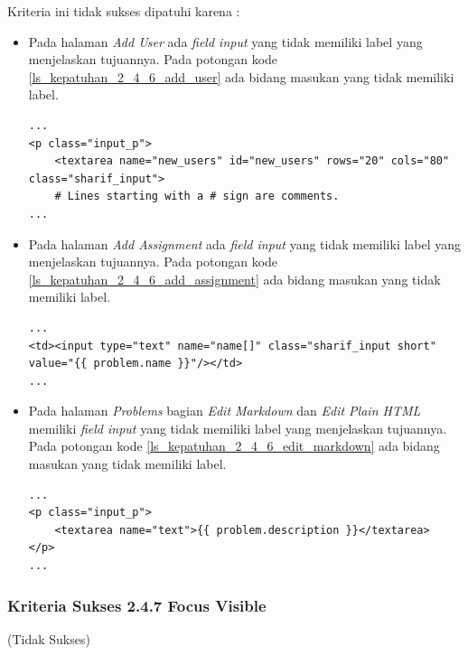 \documentclass[a4paper,twoside]{article}
\begin{document}
\begin{enumerate}
		Kriteria ini tidak sukses dipatuhi karena :
		\begin{itemize}
			\item Pada halaman \textit{Add User} ada \textit{field input} yang tidak memiliki label yang menjelaskan tujuannya. Pada potongan kode \ref{ls_kepatuhan_2_4_6_add_user} ada bidang masukan yang tidak memiliki label.
			\begin{lstlisting}[basicstyle=\ttfamily, frame=single,
			columns=fullflexible, keepspaces=true, breaklines=true, label=ls_kepatuhan_2_4_6_add_user, caption=Kriteria Sukses 2.4.6 - Halaman \textit{Add User}]
...
<p class="input_p">
	<textarea name="new_users" id="new_users" rows="20" cols="80" class="sharif_input">
	# Lines starting with a # sign are comments.
...
			\end{lstlisting}
			
			\item Pada halaman \textit{Add Assignment} ada \textit{field input} yang tidak memiliki label yang menjelaskan tujuannya. Pada potongan kode \ref{ls_kepatuhan_2_4_6_add_assignment} ada bidang masukan yang tidak memiliki label.
			\begin{lstlisting}[basicstyle=\ttfamily, frame=single,
			columns=fullflexible, keepspaces=true, breaklines=true, label=ls_kepatuhan_2_4_6_add_assignment, caption=Kriteria Sukses 2.4.6 - Halaman \textit{Add Assignment}]
...
<td><input type="text" name="name[]" class="sharif_input short" value="{{ problem.name }}"/></td>
...
			\end{lstlisting}
			
			\item Pada halaman \textit{Problems} bagian \textit{Edit Markdown} dan \textit{Edit Plain HTML} memiliki \textit{field input} yang tidak memiliki label yang menjelaskan tujuannya. Pada potongan kode \ref{ls_kepatuhan_2_4_6_edit_markdown} ada bidang masukan yang tidak memiliki label.
			\begin{lstlisting}[basicstyle=\ttfamily, frame=single,
			columns=fullflexible, keepspaces=true, breaklines=true, label=ls_kepatuhan_2_4_6_edit_markdown, caption=Kriteria Sukses 2.4.6 - Halaman \textit{Problems} bagian \textit{Edit Markdown}]
...
<p class="input_p">
	<textarea name="text">{{ problem.description }}</textarea>
</p>
...
			\end{lstlisting}
			
		\end{itemize}
		
		\subsubsection*{Kriteria Sukses 2.4.7 Focus Visible}
		\label{subsubsec:kepatuhan_kriteria_2.4.7}
		(Tidak Sukses) \\
		

\end{enumerate}
\end{document}
